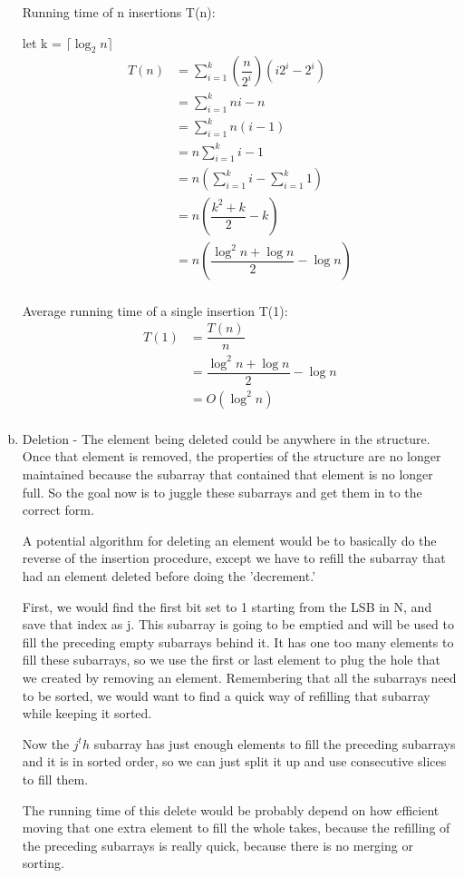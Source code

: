 \documentclass[a4paper,12pt]{article}
\begin{document}
\begin{enumerate}[a)]
  Running time of n insertions T(n):

  let k = \(\lceil \log_2 n \rceil\)
  \begin{align*}
    T(n)& = \sum_{i=1}^k (\dfrac{n}{2^i})(i2^i - 2^i)\\
    &= \sum_{i=1}^k ni - n\\
    &= \sum_{i=1}^k n(i - 1)\\
    &= n\sum_{i=1}^k i - 1\\
    &= n\left(\sum_{i=1}^k i - \sum_{i=1}^k 1\right)\\
    &= n\left( \dfrac{k^2 + k}{2} - k \right)\\
    &= n\left( \dfrac{\log^2 n + \log n}{2} - \log n \right)\\
  \end{align*}

  Average running time of a single insertion T(1):
  \begin{align*}
    T(1)& = \dfrac{T(n)}{n}\\
    &= \dfrac{\log^2 n + \log n}{2} - \log n\\
    &= O(\log^2 n)\\
  \end{align*}

\item Deletion - The element being deleted could be anywhere in the
  structure. Once that element is removed, the properties of the
  structure are no longer maintained because the subarray that
  contained that element is no longer full. So the goal now is to
  juggle these subarrays and get them in to the correct form.

  \noindent A potential algorithm for deleting an element would be to
  basically do the reverse of the insertion procedure, except we have
  to refill the subarray that had an element deleted before doing the
  'decrement.'

  \noindent First, we would find the first bit set to 1 starting from
  the LSB in N, and save that index as j. This subarray is going to be
  emptied and will be used to fill the preceding empty subarrays
  behind it. It has one too many elements to fill these subarrays, so
  we use the first or last element to plug the hole that we created by
  removing an element. Remembering that all the subarrays need to be
  sorted, we would want to find a quick way of refilling that subarray
  while keeping it sorted.

  \noindent Now the \(j^th\) subarray has just enough elements to fill
  the preceding subarrays and it is in sorted order, so we can just
  split it up and use consecutive slices to fill them.

  \noindent The running time of this delete would be probably depend
  on how efficient moving that one extra element to fill the whole
  takes, because the refilling of the preceding subarrays is really
  quick, because there is no merging or sorting.

\end{enumerate}
\end{document}
